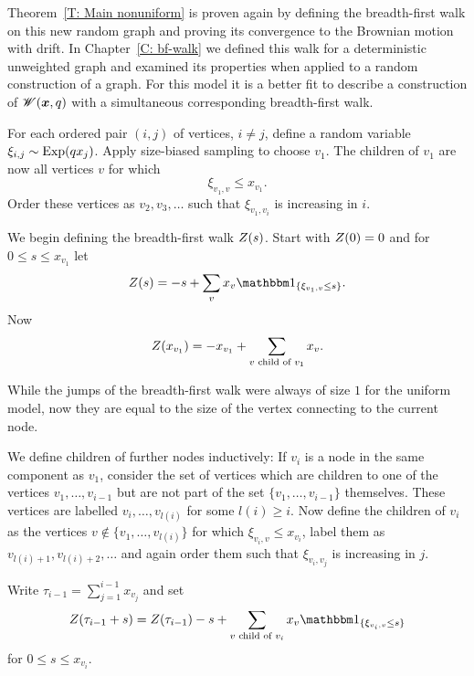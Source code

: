Theorem~\ref{T: Main nonuniform} is proven again by defining the breadth-first walk on this new random graph
and proving its convergence to the Brownian motion with drift.
In Chapter~\ref{C: bf-walk} we defined this walk for a deterministic unweighted graph 
and examined its properties when applied to a random construction of a graph.
For this model it is a better fit to describe a construction of $\mathscr{W}(\boldsymbol{x}, q)$ with a simultaneous corresponding breadth-first walk.

For each ordered pair $(i, j)$ of vertices, $i \neq j$, define a random variable $\xi_{i,j} \sim \operatorname*{Exp}(q x_j)$.
Apply size-biased sampling to choose $v_1$.
The children of $v_1$ are now all vertices $v$ for which
\begin{equation}
	\xi_{v_1, v} \leq x_{v_1}.
\end{equation}
Order these vertices as $v_2, v_3, \dots$ such that $\xi_{v_1, v_i}$ is increasing in $i$.

We begin defining the breadth-first walk $Z(s)$.
Start with $Z(0) = 0$ and for $0 \leq s \leq x_{v_1}$ let
\begin{equation}
	\bfw(s) = -s + \sum_{v} x_v \Ind{\{\xi_{v_1, v} \leq s\}}.
\end{equation}
Now
\begin{equation}
	Z(x_{v_1}) = -x_{v_1} + \sum_{\text{$v$ child of $v_1$}} x_v.
\end{equation}


While the jumps of the breadth-first walk were always of size $1$ for the uniform model,
now they are equal to the size of the vertex connecting to the current node.

We define children of further nodes inductively:
If $v_i$ is a node in the same component as $v_1$,
consider the set of vertices which are children to one of the vertices $v_1, \dots, v_{i-1}$
but are not part of the set $\{v_1, \dots, v_{i-1}\}$ themselves.
These vertices are labelled $v_i, \dots, v_{l(i)}$ for some $l(i) \geq i$.
Now define the children of $v_i$ as the vertices 
$v \notin \{v_1, \dots, v_{l(i)}\}$ for which $\xi_{v_i, v} \leq x_{v_i}$,
label them as $v_{l(i) + 1}, v_{l(i) + 2}, \dots$ 
and again order them such that $\xi_{v_i, v_j}$ is increasing in $j$.
 
Write $\tau_{i-1} = \sum_{j = 1}^{i-1} x_{v_j}$ and set
\begin{equation}
	\bfw(\tau_{i-1} + s) = \bfw(\tau_{i-1}) - s + \sum_{\text{$v$ child of $v_i$}} x_v \Ind{\{\xi_{v_i, v} \leq s\}}
\end{equation}
for $0 \leq s \leq x_{v_i}$.

